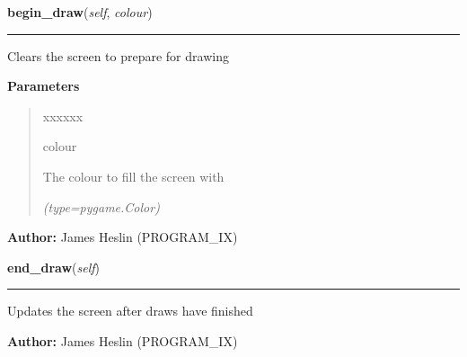     \label{pystroke:draw_engine:DrawEngine:begin_draw}

    \vspace{0.5ex}

\hspace{.8\funcindent}\begin{boxedminipage}{\funcwidth}

    \raggedright \textbf{begin\_draw}(\textit{self}, \textit{colour})

    \vspace{-1.5ex}

    \rule{\textwidth}{0.5\fboxrule}
\setlength{\parskip}{2ex}
    Clears the screen to prepare for drawing

\setlength{\parskip}{1ex}
      \textbf{Parameters}
      \vspace{-1ex}

      \begin{quote}
        \begin{Ventry}{xxxxxx}

          \item[colour]

          The colour to fill the screen with

            {\it (type=pygame.Color)}

        \end{Ventry}

      \end{quote}

\textbf{Author:} James Heslin (PROGRAM\_IX)



    \end{boxedminipage}

    \label{pystroke:draw_engine:DrawEngine:end_draw}

    \vspace{0.5ex}

\hspace{.8\funcindent}\begin{boxedminipage}{\funcwidth}

    \raggedright \textbf{end\_draw}(\textit{self})

    \vspace{-1.5ex}

    \rule{\textwidth}{0.5\fboxrule}
\setlength{\parskip}{2ex}
    Updates the screen after draws have finished

\setlength{\parskip}{1ex}
\textbf{Author:} James Heslin (PROGRAM\_IX)



    \end{boxedminipage}

